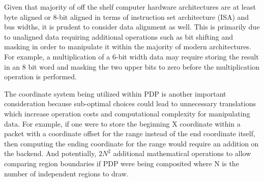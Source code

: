     Given that majority of off the shelf computer hardware architectures are at least byte aligned or 8-bit aligned in terms of instruction set architecture (ISA) and bus widths, it is prudent to consider data alignment as well. This is primarily due to unaligned data requiring additional operations such as bit shifting and masking in order to manipulate it within the majority of modern architectures. For example, a multiplication of a 6-bit width data may require storing the result in an 8 bit word and masking the two upper bits to zero before the multiplication operation is performed.

    The coordinate system being utilized within PDP is another important consideration because sub-optimal choices could lead to unnecessary translations which increase operation costs and computational complexity for manipulating data. For example, if one were to store the beginning X coordinate within a packet with a coordinate offset for the range instead of the end coordinate itself, then computing the ending coordinate for the range would require an addition on the backend. And potentially, $2N^2$ additional mathematical operations to allow comparing region boundaries if PDP were being composited where N is the number of independent regions to draw.



